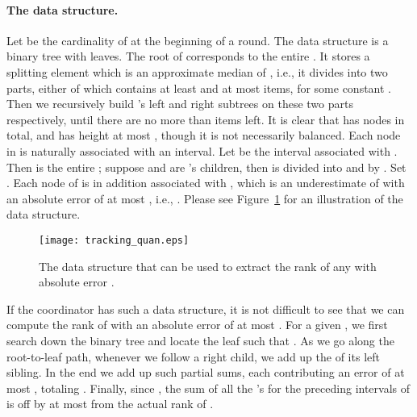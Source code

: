 \documentclass[10pt]{article}
\begin{document}
\paragraph{The data structure.}
Let  be the cardinality of  at the beginning of a round. The data
structure is a binary tree  with  leaves.  The root 
of  corresponds to the entire .  It stores a splitting element 
which is an approximate median of , i.e., it divides  into two parts,
either of which contains at least  and at most
 items, for some constant .
Then we recursively build 's left and right subtrees on these two parts
respectively, until there are no more than  items left.  It is
clear that  has  nodes in total, and has height at most
, though it is not necessarily balanced.  Each
node in  is naturally associated with an interval.  Let  be the
interval associated with .  Then  is the entire ; suppose 
and  are 's children, then  is divided into  and  by
.  Set .  Each node  of  is in
addition associated with , which is an underestimate of 
with an absolute error of at most , i.e., . Please see Figure~\ref{fig:tracking_quan} for an
illustration of the data structure.


\begin{figure}
\begin{center}
\texttt{[image: tracking\_quan.eps]}
\caption{The data structure that can be used to extract the rank of any
 with absolute error .} \label{fig:tracking_quan}
\end{center}
\end{figure}

If the coordinator has such a data structure, it is not difficult to see
that we can compute the rank of  with an absolute error of at most .  For a given , we first search down the binary tree and locate the
leaf  such that .  As we go along the root-to-leaf path,
whenever we follow a right child, we add up the  of its left sibling.
In the end we add up  such partial sums, each contributing an error
of at most , totaling .
Finally, since , the sum of all the 's for
the preceding intervals of  is off by at most  from the actual
rank of .
\end{document}
